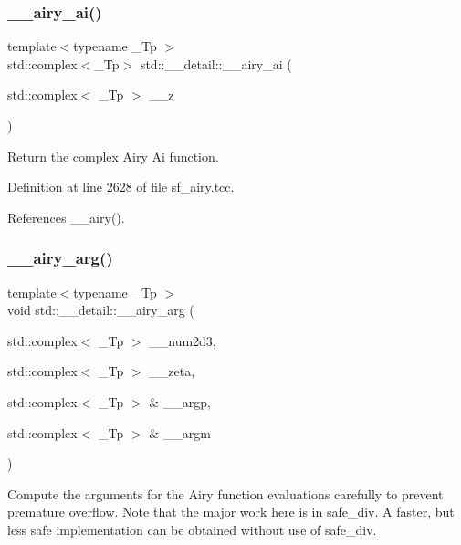 \subsubsection{\texorpdfstring{\+\_\+\+\_\+airy\+\_\+ai()}{\_\_airy\_ai()}}
{\footnotesize\ttfamily template$<$typename \+\_\+\+Tp $>$ \\
std\+::complex$<$\+\_\+\+Tp$>$ std\+::\+\_\+\+\_\+detail\+::\+\_\+\+\_\+airy\+\_\+ai (\begin{DoxyParamCaption}\item[{std\+::complex$<$ \+\_\+\+Tp $>$}]{\+\_\+\+\_\+z }\end{DoxyParamCaption})}



Return the complex Airy Ai function. 



Definition at line 2628 of file sf\+\_\+airy.\+tcc.



References \+\_\+\+\_\+airy().

\mbox{\label{namespacestd_1_1____detail_a2473fe60310e9480137e3b66d3944f15}} 
\subsubsection{\texorpdfstring{\+\_\+\+\_\+airy\+\_\+arg()}{\_\_airy\_arg()}}
{\footnotesize\ttfamily template$<$typename \+\_\+\+Tp $>$ \\
void std\+::\+\_\+\+\_\+detail\+::\+\_\+\+\_\+airy\+\_\+arg (\begin{DoxyParamCaption}\item[{std\+::complex$<$ \+\_\+\+Tp $>$}]{\+\_\+\+\_\+num2d3,  }\item[{std\+::complex$<$ \+\_\+\+Tp $>$}]{\+\_\+\+\_\+zeta,  }\item[{std\+::complex$<$ \+\_\+\+Tp $>$ \&}]{\+\_\+\+\_\+argp,  }\item[{std\+::complex$<$ \+\_\+\+Tp $>$ \&}]{\+\_\+\+\_\+argm }\end{DoxyParamCaption})}



Compute the arguments for the Airy function evaluations carefully to prevent premature overflow. Note that the major work here is in {\ttfamily safe\+\_\+div}. A faster, but less safe implementation can be obtained without use of safe\+\_\+div. 


